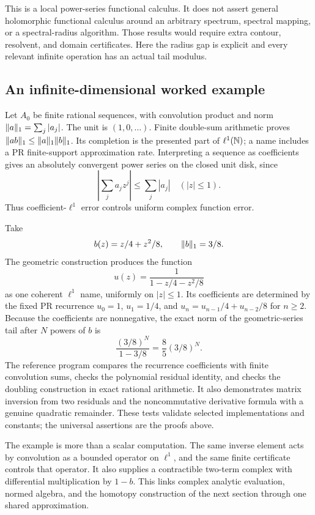 This is a local power-series functional calculus. It does not assert general holomorphic functional calculus around an arbitrary spectrum, spectral mapping, or a spectral-radius algorithm. Those results would require extra contour, resolvent, and domain certificates. Here the radius gap is explicit and every relevant infinite operation has an actual tail modulus.

\subsection{An infinite-dimensional worked example}

Let $A_0$ be finite rational sequences, with convolution product and norm
$\lVert a\rVert_1=\sum_j|a_j|$. The unit is $(1,0,\ldots)$. Finite double-sum arithmetic proves $\lVert ab\rVert_1\le\lVert a\rVert_1\lVert b\rVert_1$. Its completion is the presented part of $\ell^1(\mathbb N)$; a name includes a PR finite-support approximation rate. Interpreting a sequence as coefficients gives an absolutely convergent power series on the closed unit disk, since
\[
 \left|\sum_j a_jz^j\right|\le\sum_j|a_j|\quad(|z|\le1).
\]
Thus coefficient-$\ell^1$ error controls uniform complex function error.

Take
\[
 b(z)=z/4+z^2/8,\qquad\lVert b\rVert_1=3/8.
\]
The geometric construction produces the function
\[
 u(z)=\frac1{1-z/4-z^2/8}
\]
as one coherent $\ell^1$ name, uniformly on $|z|\le1$. Its coefficients are determined by the fixed PR recurrence
$u_0=1$, $u_1=1/4$, and
$u_n=u_{n-1}/4+u_{n-2}/8$ for $n\ge2$.
Because the coefficients are nonnegative, the exact norm of the geometric-series tail after $N$ powers of $b$ is
\[
 \frac{(3/8)^N}{1-3/8}=\frac85(3/8)^N.
\]
The reference program compares the recurrence coefficients with finite convolution sums, checks the polynomial residual identity, and checks the doubling construction in exact rational arithmetic. It also demonstrates matrix inversion from two residuals and the noncommutative derivative formula with a genuine quadratic remainder. These tests validate selected implementations and constants; the universal assertions are the proofs above.

The example is more than a scalar computation. The same inverse element acts by convolution as a bounded operator on $\ell^1$, and the same finite certificate controls that operator. It also supplies a contractible two-term complex with differential multiplication by $1-b$. This links complex analytic evaluation, normed algebra, and the homotopy construction of the next section through one shared approximation.
